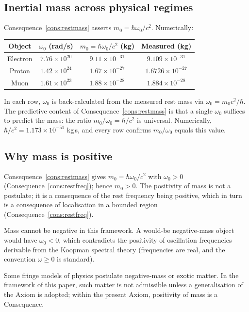 \documentclass[11pt,twocolumn,a4paper]{article}
\theoremstyle{axiomstyle}
\theoremstyle{conseqstyle}
\theoremstyle{definition}
\theoremstyle{remark}
\begin{document}
\subsection{Inertial mass across physical regimes}

Consequence~\ref{cons:restmass} asserts $m_{0}=\hbar\omega_{0}/c^{2}$. Numerically:
\begin{center}
\begin{tabular}{c|c|c|c}
\toprule
Object & $\omega_{0}$ (rad/s) & $m_{0}=\hbar\omega_{0}/c^{2}$ (kg) & Measured (kg) \\
\midrule
Electron & $7.76\times 10^{20}$ & $9.11\times 10^{-31}$ & $9.109\times 10^{-31}$ \\
Proton & $1.42\times 10^{24}$ & $1.67\times 10^{-27}$ & $1.6726\times 10^{-27}$ \\
Muon & $1.61\times 10^{23}$ & $1.88\times 10^{-28}$ & $1.884\times 10^{-28}$ \\
\bottomrule
\end{tabular}
\end{center}

In each row, $\omega_{0}$ is back-calculated from the measured rest mass via $\omega_{0}=m_{0}c^{2}/\hbar$. The predictive content of Consequence~\ref{cons:restmass} is that a single $\omega_{0}$ suffices to predict the mass: the ratio $m_{0}/\omega_{0}=\hbar/c^{2}$ is universal. Numerically, $\hbar/c^{2}=1.173\times 10^{-51}$ kg\,s, and every row confirms $m_{0}/\omega_{0}$ equals this value.

\subsection{Why mass is positive}

Consequence~\ref{cons:restmass} gives $m_{0}=\hbar\omega_{0}/c^{2}$ with $\omega_{0}>0$ (Consequence~\ref{cons:restfreq}); hence $m_{0}>0$. The positivity of mass is not a postulate; it is a consequence of the rest frequency being positive, which in turn is a consequence of localisation in a bounded region (Consequence~\ref{cons:restfreq}).

Mass cannot be negative in this framework. A would-be negative-mass object would have $\omega_{0}<0$, which contradicts the positivity of oscillation frequencies derivable from the Koopman spectral theory (frequencies are real, and the convention $\omega\ge 0$ is standard).

Some fringe models of physics postulate negative-mass or exotic matter. In the framework of this paper, such matter is not admissible unless a generalisation of the Axiom is adopted; within the present Axiom, positivity of mass is a Consequence.
\end{document}
